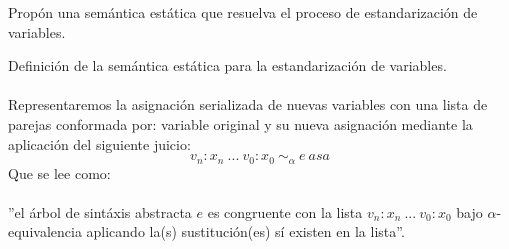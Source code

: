         \begin{exercise} 
	Propón una semántica estática que resuelva el proceso de estandarización de variables.
    \end{exercise}
	\begin{definition} Definición de la semántica estática para la estandarización de variables.\\\\
	Representaremos la asignación serializada de nuevas variables con una lista de parejas conformada por: variable original y su nueva asignación mediante la aplicación del siguiente juicio: $$v_n:x_n\ ...\ v_0:x_0\ \sim_{\alpha}\ e\ asa$$ 
          Que se lee como: \\\\
	''el árbol de sintáxis abstracta $e$ es congruente con la lista $v_n: x_n\ ...\ v_0:x_0$ bajo $\alpha$-equivalencia aplicando la(s) sustitución(es) sí existen en la lista''.\\


\end{definition}
